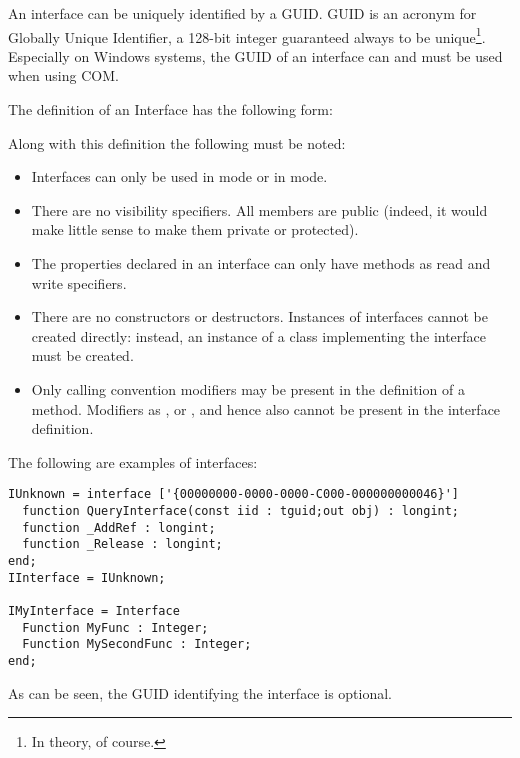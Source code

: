 An interface can be uniquely identified by a GUID. GUID is an acronym for
Globally Unique Identifier, a 128-bit integer guaranteed always to be
unique\footnote{In theory, of course.}. Especially on Windows systems,
the GUID of an interface can and must be used when using COM.

The definition of an Interface has the following
form:

Along with this definition the following must be noted:
\begin{itemize}
\item Interfaces can only be used in  mode or in 
mode.
\item There are no visibility specifiers. All members are public (indeed,
it would make little sense to make them private or
protected).
\item The properties declared in an interface can only have methods as read and
write specifiers.
\item There are no constructors or destructors. Instances of interfaces
cannot be created directly: instead, an instance of a class implementing
the interface must be created.
\item Only calling convention modifiers may be present in the definition of
a method. Modifiers as ,  or , and
hence also  cannot be present in the interface
definition.
\end{itemize}
The following are examples of interfaces:
\begin{verbatim}
IUnknown = interface ['{00000000-0000-0000-C000-000000000046}']
  function QueryInterface(const iid : tguid;out obj) : longint;
  function _AddRef : longint;
  function _Release : longint;
end;
IInterface = IUnknown;

IMyInterface = Interface
  Function MyFunc : Integer;
  Function MySecondFunc : Integer;
end;
\end{verbatim}
As can be seen, the GUID identifying the interface is optional.

